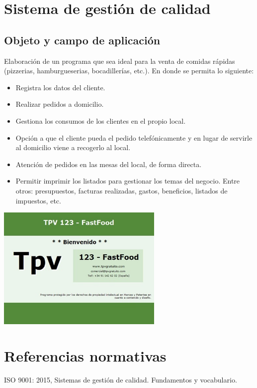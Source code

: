 \documentclass[12pt,a4paper]{article}
\begin{document}
\section{Sistema de gestión de calidad}\textbf{}
\subsection{Objeto y campo de aplicación}
Elaboración de un programa que sea ideal para la venta de comidas rápidas (pizzerias, hamburgueserias, bocadillerías, etc.). En donde se permita lo siguiente:
\begin{itemize}
\item Registra los datos del cliente.
\item Realizar pedidos a domicilio.
\item Gestiona los consumos de los clientes en el propio local.
\item Opción a que el cliente pueda el pedido telefónicamente y en lugar de servirle al domicilio viene a recogerlo al local.
\item Atención de pedidos en las mesas del local, de forma directa.
\item Permitir imprimir los listados para gestionar los temas del negocio. Entre otros: presupuestos, facturas realizadas, gastos, beneficios, listados de impuestos, etc.
\end{itemize}
\begin{center}
\includegraphics[width=0.6\textwidth]{primeraimagen.jpg}  
\end{center}

\section{Referencias normativas}\textbf{}
ISO 9001: 2015, Sistemas de gestión de calidad. Fundamentos y vocabulario.
\end{document}
